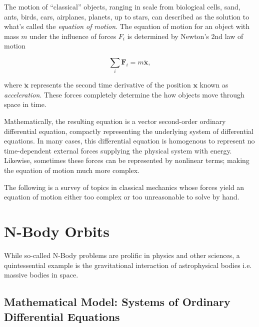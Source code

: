 \documentclass{report}
\begin{document}
    The motion of ``classical'' objects, ranging in scale from biological cells, sand, ants, birds, cars, airplanes, planets, up to stars, can described as the solution to what's called the \emph{equation of motion}.  The equation of motion for an object with mass $m$ under the influence of forces $F_i$ is determined by Newton's 2nd law of motion
    
    \begin{equation} \label{eq:newton}
        \sum_i \mathbf{F}_i = m \ddot{\mathbf{x}},
    \end{equation}

    where $\ddot{\mathbf{x}}$ represents the second time derivative of the position $\mathbf{x}$ known as \emph{acceleration}.  These forces completely determine the how objects move through space in time.
    
    Mathematically, the resulting equation is a vector second-order ordinary differential equation, compactly representing the underlying system of differential equations.  In many cases, this differential equation is homogenous to represent no time-dependent external forces supplying the physical system with energy.  Likewise, sometimes these forces can be represented by nonlinear terms; making the equation of motion much more complex.
    
    The following is a survey of topics in classical mechanics whose forces yield an equation of motion either too complex or too unreasonable to solve by hand.

\pagebreak

    \section{N-Body Orbits} \label{subsec:orbits}

        While so-called N-Body problems are prolific in physics and other sciences, a quintessential example is the gravitational interaction of astrophysical bodies i.e. massive bodies in space.

        \subsection{Mathematical Model: Systems of Ordinary Differential Equations}
\end{document}
